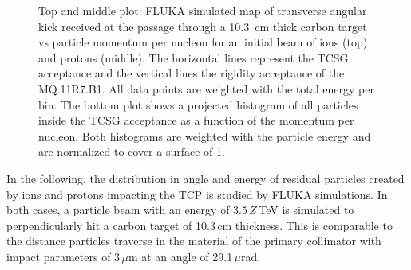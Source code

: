 \begin{figure}[htbp]
\begin{tikzpicture}
  \end{tikzpicture}
  \caption{Top and middle plot: FLUKA simulated map of transverse angular kick received at the passage through a 10.3~cm thick carbon target vs particle momentum per nucleon for an initial beam of \lead ions (top) and protons (middle). The horizontal lines represent the TCSG acceptance and the vertical lines the rigidity acceptance of the MQ.11R7.B1. All data points are weighted with the total energy per bin. The bottom plot shows a projected histogram of all particles inside the TCSG acceptance as a function of the momentum per nucleon. Both histograms are weighted with the particle energy and are normalized to cover a surface of 1. }  
  \label{pic:16072101} %
  \end{figure}








In the following, the distribution in angle and energy of residual particles created by \lead ions and protons impacting the TCP is studied by FLUKA simulations. In both cases, a particle beam with an energy of $3.5\,Z\,$TeV is simulated to perpendicularly hit a carbon target of 10.3$\,$cm thickness. This is comparable to the distance particles traverse in the material of the primary collimator with impact parameters of $3\,\mu$m at an angle of 29.1$\,\mu$rad.

